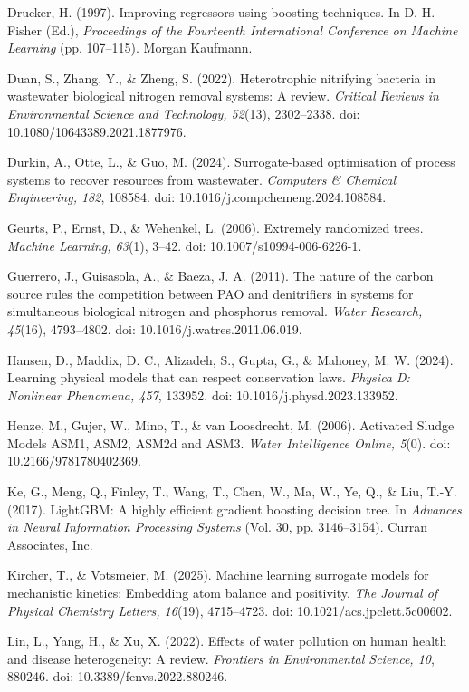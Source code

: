 \documentclass[a4paper,fleqn]{cas-sc}
\begin{document}
\noindent Drucker, H. (1997). Improving regressors using boosting techniques. In D. H. Fisher (Ed.), \textit{Proceedings of the Fourteenth International Conference on Machine Learning} (pp. 107--115). Morgan Kaufmann.

\noindent Duan, S., Zhang, Y., \& Zheng, S. (2022). Heterotrophic nitrifying bacteria in wastewater biological nitrogen removal systems: A review. \textit{Critical Reviews in Environmental Science and Technology, 52}(13), 2302--2338. doi: 10.1080/10643389.2021.1877976.

\noindent Durkin, A., Otte, L., \& Guo, M. (2024). Surrogate-based optimisation of process systems to recover resources from wastewater. \textit{Computers \& Chemical Engineering, 182}, 108584. doi: 10.1016/j.compchemeng.2024.108584.

\noindent Geurts, P., Ernst, D., \& Wehenkel, L. (2006). Extremely randomized trees. \textit{Machine Learning, 63}(1), 3--42. doi: 10.1007/s10994-006-6226-1.

\noindent Guerrero, J., Guisasola, A., \& Baeza, J. A. (2011). The nature of the carbon source rules the competition between PAO and denitrifiers in systems for simultaneous biological nitrogen and phosphorus removal. \textit{Water Research, 45}(16), 4793--4802. doi: 10.1016/j.watres.2011.06.019.

\noindent Hansen, D., Maddix, D. C., Alizadeh, S., Gupta, G., \& Mahoney, M. W. (2024). Learning physical models that can respect conservation laws. \textit{Physica D: Nonlinear Phenomena, 457}, 133952. doi: 10.1016/j.physd.2023.133952.

\noindent Henze, M., Gujer, W., Mino, T., \& van Loosdrecht, M. (2006). Activated Sludge Models ASM1, ASM2, ASM2d and ASM3. \textit{Water Intelligence Online, 5}(0). doi: 10.2166/9781780402369.

\noindent Ke, G., Meng, Q., Finley, T., Wang, T., Chen, W., Ma, W., Ye, Q., \& Liu, T.-Y. (2017). LightGBM: A highly efficient gradient boosting decision tree. In \textit{Advances in Neural Information Processing Systems} (Vol. 30, pp. 3146--3154). Curran Associates, Inc.

\noindent Kircher, T., \& Votsmeier, M. (2025). Machine learning surrogate models for mechanistic kinetics: Embedding atom balance and positivity. \textit{The Journal of Physical Chemistry Letters, 16}(19), 4715--4723. doi: 10.1021/acs.jpclett.5c00602.

\noindent Lin, L., Yang, H., \& Xu, X. (2022). Effects of water pollution on human health and disease heterogeneity: A review. \textit{Frontiers in Environmental Science, 10}, 880246. doi: 10.3389/fenvs.2022.880246.
\end{document}
